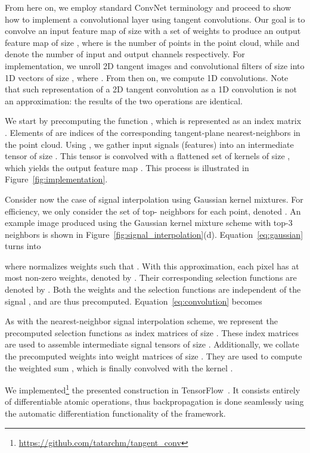 \documentclass[10pt,twocolumn,letterpaper]{article}
\begin{document}
From here on, we employ standard ConvNet terminology and proceed to show how to implement a convolutional layer using tangent convolutions. Our goal is to convolve an input feature map  of size  with a set of weights  to produce an output feature map  of size , where  is the number of points in the point cloud, while  and  denote the number of input and output channels respectively.
For implementation, we unroll 2D tangent images and convolutional filters of size  into 1D vectors of size , where . From then on, we compute 1D convolutions. Note that such representation of a 2D tangent convolution as a 1D convolution is not an approximation: the results of the two operations are identical.



We start by precomputing the function , which is represented as an  index matrix .
Elements of  are indices of the corresponding tangent-plane nearest-neighbors in the point cloud.
Using , we gather input signals (features) into an intermediate tensor  of size .
This tensor is convolved with a flattened set of kernels  of size , which yields the output feature map . This process is illustrated in Figure~\ref{fig:implementation}.

Consider now the case of signal interpolation using Gaussian kernel mixtures.
For efficiency, we only consider the set of top- neighbors for each point, denoted .
An example image produced using the Gaussian kernel mixture scheme with top-3 neighbors is shown in Figure~\ref{fig:signal_interpolation}(d).
Equation~\eqref{eq:gaussian} turns into

where  normalizes weights such that . With this approximation, each pixel  has at most  non-zero weights, denoted by . Their corresponding selection functions are denoted by . Both the weights and the selection functions are independent of the signal , and are thus precomputed. Equation~\eqref{eq:convolution} becomes





As with the nearest-neighbor signal interpolation scheme, we represent the precomputed selection functions  as  index matrices  of size . These index matrices are used to assemble  intermediate signal tensors  of size . Additionally, we collate the precomputed weights into  weight matrices  of size . They are used to compute the weighted sum , which is finally convolved with the kernel .


We implemented\footnote{\url{https://github.com/tatarchm/tangent_conv}} the presented construction in TensorFlow~\cite{abadi16}.
It consists entirely of differentiable atomic operations, thus backpropagation is done seamlessly using the automatic differentiation functionality of the framework.
\end{document}
